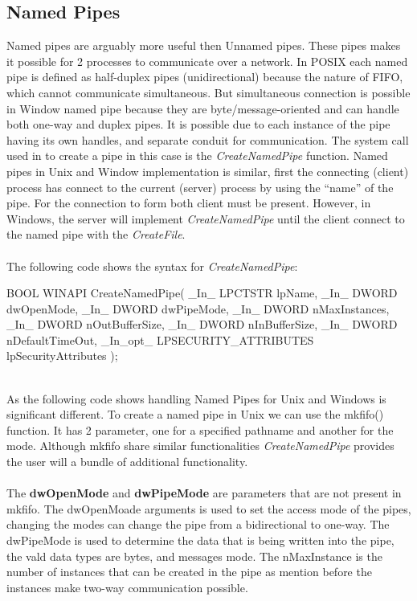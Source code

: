 \documentclass[a4paper]{article}
\begin{document}
\subsection{ Named Pipes}
Named pipes are arguably more useful then Unnamed pipes.  These pipes makes it possible for 2 processes to communicate over a network. In POSIX each named pipe is defined as half-duplex pipes (unidirectional) because the nature of FIFO, which cannot communicate simultaneous. But simultaneous connection is possible in Window named pipe because they are byte/message-oriented and can handle both one-way and duplex pipes. It is possible due to each instance of the pipe having its own handles, and separate conduit for communication. The system call used in to create a pipe in this case is the \textit{CreateNamedPipe} function. Named pipes in Unix and Window implementation is similar, first the connecting (client) process has connect to the current (server)  process by using the “name” of the pipe. For the connection to form both client must be present. However, in Windows, the server will implement \textit{CreateNamedPipe} until the client connect to the named pipe with the \textit{CreateFile}. \\
\\
The following code shows the syntax for \textit{CreateNamedPipe}:\\
\begin{code} 

BOOL WINAPI CreateNamedPipe(
	_In_      LPCTSTR lpName,
	_In_      DWORD dwOpenMode,
 	_In_      DWORD dwPipeMode,
	_In_      DWORD nMaxInstances,
	_In_      DWORD nOutBufferSize,
 	_In_      DWORD nInBufferSize,
	_In_      DWORD nDefaultTimeOut,
	_In_opt_  LPSECURITY_ATTRIBUTES lpSecurityAttributes
);

\end{code}\\
As the following code shows handling Named Pipes for Unix and Windows is significant different. To create a named pipe in Unix we can use the mkfifo() function. It has 2 parameter, one for a specified pathname and another for the mode. Although mkfifo share similar functionalities \textit{CreateNamedPipe} provides the user will a bundle of additional functionality.\\
\\
The \textbf{dwOpenMode} and \textbf{dwPipeMode} are parameters that are not present in mkfifo. The dwOpenMoade arguments is used to set the access mode of the pipes, changing the modes can change the pipe from a bidirectional to one-way. The dwPipeMode is used to determine the data that is being written into the pipe, the vald data types are bytes, and messages mode. The nMaxInstance is the number of instances that can be created in the pipe as mention before the instances make two-way communication possible.
\end{document}
